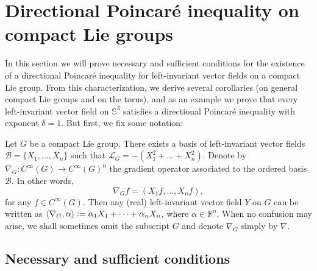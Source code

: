\documentclass[11pt]{amsart}
\numberwithin{theorem}{section}
\numberwithin{equation}{section}
\theoremstyle{definition}
\numberwithin{example}{section}
\theoremstyle{definition}
\theoremstyle{definition}
\newcommand{\R}{\mathbb{R}}
\renewcommand{\S}{\mathbb{S}^3}
\begin{document}
\section{Directional Poincaré inequality on compact Lie groups}

In this section we will prove necessary and sufficient conditions for the existence of a directional Poincaré inequality for left-invariant vector fields on a compact Lie group. From this characterization, we derive several corollaries (on general compact Lie groups and on the torus), and as an example we prove that every left-invariant vector field on $\S$ satisfies a directional Poincaré inequality with exponent $\delta=1$. But first, we fix some notation:


Let $G$ be a compact Lie group. There exists a basis of left-invariant vector fields $\mathcal{B}=\{X_1,\dots,X_n\}$ such that $\mathcal{L}_G=-(X_1^2+\dots+X_n^2)$. Denote by $\nabla_G:C^\infty(G)\to C^\infty(G)^n$ the gradient operator associated to the ordered basis $\mathcal{B}$. In other words,
\begin{equation*}
\nabla_Gf = (X_1f,\dots, X_nf),    
\end{equation*}
 for any $f\in C^\infty(G)$. Then any (real) left-invariant vector field $Y$ on $G$ can be written as $\langle \nabla_G,\alpha\rangle\vcentcolon=\alpha_1X_1+\dots +\alpha_n X_n$, where $\alpha\in \R^n$. When no confusion may arise, we shall sometimes omit the subscript $G$ and denote $\nabla_G$ simply by $\nabla.$ 




\subsection{Necessary and sufficient conditions}\label{sect_nec_suff}
\end{document}
